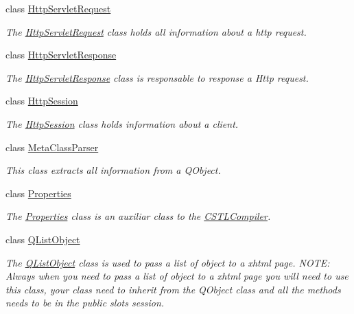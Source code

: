 \begin{DoxyCompactItemize}
class \hyperlink{class_c_w_f_1_1_http_servlet_request}{Http\+Servlet\+Request}
\begin{DoxyCompactList}\small\item\em The \hyperlink{class_c_w_f_1_1_http_servlet_request}{Http\+Servlet\+Request} class holds all information about a http request. \end{DoxyCompactList}\item 
class \hyperlink{class_c_w_f_1_1_http_servlet_response}{Http\+Servlet\+Response}
\begin{DoxyCompactList}\small\item\em The \hyperlink{class_c_w_f_1_1_http_servlet_response}{Http\+Servlet\+Response} class is responsable to response a Http request. \end{DoxyCompactList}\item 
class \hyperlink{class_c_w_f_1_1_http_session}{Http\+Session}
\begin{DoxyCompactList}\small\item\em The \hyperlink{class_c_w_f_1_1_http_session}{Http\+Session} class holds information about a client. \end{DoxyCompactList}\item 
class \hyperlink{class_c_w_f_1_1_meta_class_parser}{Meta\+Class\+Parser}
\begin{DoxyCompactList}\small\item\em This class extracts all information from a Q\+Object. \end{DoxyCompactList}\item 
class \hyperlink{class_c_w_f_1_1_properties}{Properties}
\begin{DoxyCompactList}\small\item\em The \hyperlink{class_c_w_f_1_1_properties}{Properties} class is an auxiliar class to the \hyperlink{class_c_w_f_1_1_c_s_t_l_compiler}{C\+S\+T\+L\+Compiler}. \end{DoxyCompactList}\item 
class \hyperlink{class_c_w_f_1_1_q_list_object}{Q\+List\+Object}
\begin{DoxyCompactList}\small\item\em The \hyperlink{class_c_w_f_1_1_q_list_object}{Q\+List\+Object} class is used to pass a list of object to a xhtml page. N\+O\+T\+E\+: Always when you need to pass a list of object to a xhtml page you will need to use this class, your class need to inherit from the Q\+Object class and all the methods needs to be in the public slots session. \end{DoxyCompactList}\item 

\end{DoxyCompactItemize}
